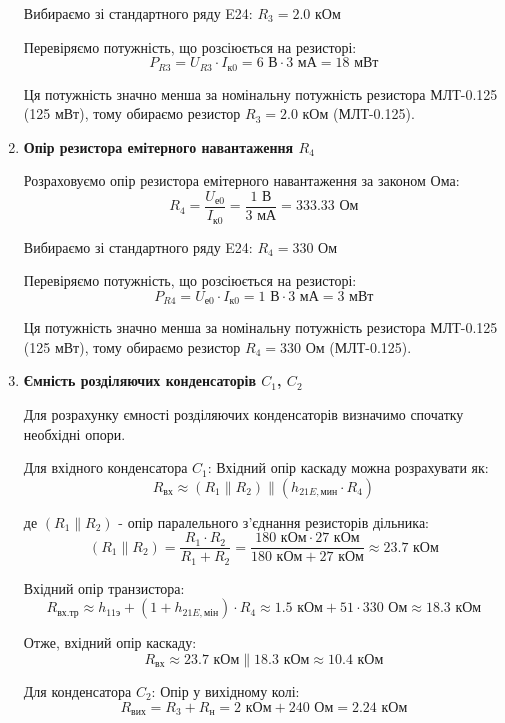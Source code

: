 \documentclass[main.tex]{subfiles}
\begin{document}
\begin{enumerate}
Вибираємо зі стандартного ряду E24: $R_3 = 2.0\text{ кОм}$

Перевіряємо потужність, що розсіюється на резисторі:
\[
P_{R3} = U_{R3} \cdot I_{\text{к0}} = 6\text{ В} \cdot 3\text{ мА} = 18\text{ мВт}
\]

Ця потужність значно менша за номінальну потужність резистора МЛТ-0.125 (125 мВт), тому обираємо резистор $R_3 = 2.0\text{ кОм}$ (МЛТ-0.125).

\item \textbf{Опір резистора емітерного навантаження $R_4$} \newline

Розраховуємо опір резистора емітерного навантаження за законом Ома:
\[
R_4 = \frac{U_{\text{е0}}}{I_{\text{к0}}} = \frac{1\text{ В}}{3\text{ мА}} = 333.33\text{ Ом}
\]

Вибираємо зі стандартного ряду E24: $R_4 = 330\text{ Ом}$

Перевіряємо потужність, що розсіюється на резисторі:
\[
P_{R4} = U_{\text{е0}} \cdot I_{\text{к0}} = 1\text{ В} \cdot 3\text{ мА} = 3\text{ мВт}
\]

Ця потужність значно менша за номінальну потужність резистора МЛТ-0.125 (125 мВт), тому обираємо резистор $R_4 = 330\text{ Ом}$ (МЛТ-0.125).

\item \textbf{Ємність розділяючих конденсаторів $C_1$, $C_2$} \newline

Для розрахунку ємності розділяючих конденсаторів визначимо спочатку необхідні опори.

Для вхідного конденсатора $C_1$:
Вхідний опір каскаду можна розрахувати як:
\[R_{\text{вх}} \approx (R_1 \parallel R_2) \parallel (h_{21E,\text{мин}} \cdot R_4)\]

де $(R_1 \parallel R_2)$ - опір паралельного з'єднання резисторів дільника:
\[(R_1 \parallel R_2) = \frac{R_1 \cdot R_2}{R_1 + R_2} = \frac{180\text{ кОм} \cdot 27\text{ кОм}}{180\text{ кОм} + 27\text{ кОм}} \approx 23.7\text{ кОм}\]

Вхідний опір транзистора:
\[R_{\text{вх.тр}} \approx h_{11э} + (1 + h_{21E,\text{мін}}) \cdot R_4 \approx 1.5\text{ кОм} + 51 \cdot 330\text{ Ом} \approx 18.3\text{ кОм}\]

Отже, вхідний опір каскаду:
\[R_{\text{вх}} \approx 23.7\text{ кОм} \parallel 18.3\text{ кОм} \approx 10.4\text{ кОм}\]

Для конденсатора $C_2$:
Опір у вихідному колі:
\[R_{\text{вих}} = R_3 + R_{\text{н}} = 2\text{ кОм} + 240\text{ Ом} = 2.24\text{ кОм}\]


\end{enumerate}
\end{document}

